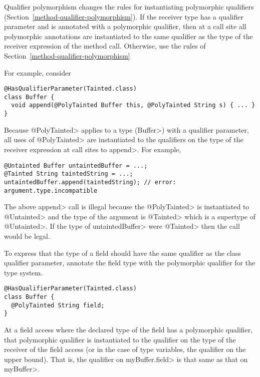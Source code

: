 
Qualifier polymorphism changes the rules for instantiating polymorphic
qualifiers (Section~\ref{method-qualifier-polymorphism}).
If the receiver type has a qualifier parameter and is annotated with a polymorphic qualifier,
then at a call site all polymorphic annotations are instantiated to
the same qualifier as the type of the receiver expression of the method call.
Otherwise, use the rules of Section~\ref{method-qualifier-polymorphism}

For example, consider

\begin{Verbatim}
@HasQualifierParameter(Tainted.class)
class Buffer {
  void append(@PolyTainted Buffer this, @PolyTainted String s) { ... }
}
\end{Verbatim}

\noindent
Because \<@PolyTainted> applies to a type (\<Buffer>) with a qualifier parameter, all
uses of \<@PolyTainted> are instantiated to the qualifiers on the type of
the receiver expression at call sites to \<append>. For example,

\begin{Verbatim}
@Untainted Buffer untaintedBuffer = ...;
@Tainted String taintedString = ...;
untaintedBuffer.append(taintedString); // error: argument.type.incompatible
\end{Verbatim}
The above \<append> call is illegal because the \<@PolyTainted> is instantiated to \<@Untainted> and
the type of the argument is \<@Tainted> which is a supertype of \<@Untainted>.  If the type of
\<untaintedBuffer> were \<@Tainted> then the call would be legal.


To express that the type of a field
should have the same qualifier as the class qualifier parameter,
annotate the field type with the polymorphic qualifier for the type system.

\begin{Verbatim}
@HasQualifierParameter(Tainted.class)
class Buffer {
  @PolyTainted String field;
}
\end{Verbatim}

At a field access where the declared type of the field has a polymorphic
qualifier, that polymorphic qualifier is instantiated to the qualifier on the
type of the receiver of the field access (or in the case of type variables, the
qualifier on the upper bound).  That is, the qualifier on \<myBuffer.field>
is that same as that on \<myBuffer>.

